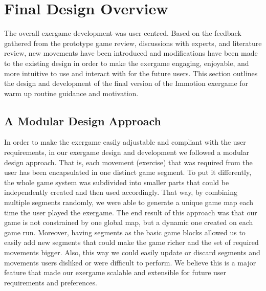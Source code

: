 \chapter{Final Design Overview}\label{chapter:finaldesign}
The overall exergame development was user centred. Based on the feedback gathered from the prototype game review, discussions with experts, and literature review, new movements have been introduced and modifications have been made to the existing design in order to make the exergame engaging, enjoyable, and more intuitive to use and interact with for the future users. This section outlines the design and development of the final version of the Immotion exergame for warm up routine guidance and motivation.
\section{A Modular Design Approach}
In order to make the exergame easily adjustable and compliant with the user requirements, in our exergame design and development we followed a modular design approach. That is, each movement (exercise) that was required from the user has been encapsulated in one distinct game segment. To put it differently, the whole game system was subdivided into smaller parts that could be independently created and then used accordingly. That way, by combining multiple segments randomly, we were able to generate a unique game map each time the user played the exergame. The end result of this approach was that our game is not constrained by one global map, but a dynamic one created on each game run. Moreover, having segments as the basic game blocks allowed us to easily add new segments that could make the game richer and the set of required movements bigger. Also, this way we could easily update or discard segments and movements users disliked or were difficult to perform. We believe this is a major feature that made our exergame scalable and extensible for future user requirements and preferences. 
